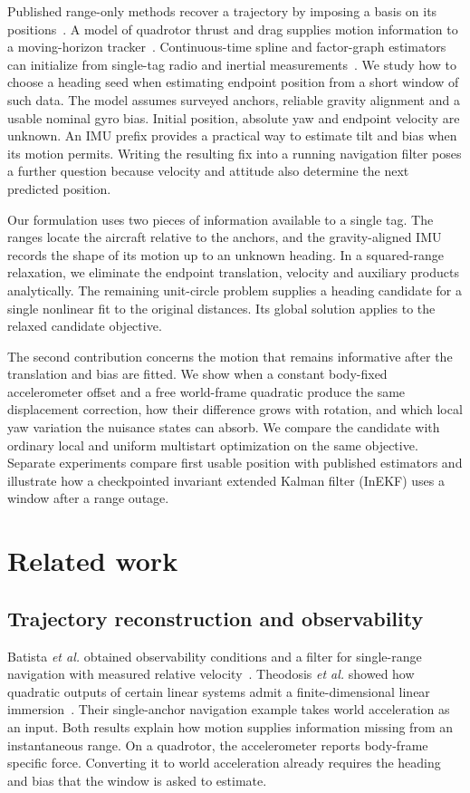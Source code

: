 \documentclass{IEEEtaes}
\begin{document}
Published range-only methods recover a trajectory by imposing a basis on its positions~\cite{pacholska}. A model of quadrotor thrust and drag supplies motion information to a moving-horizon tracker~\cite{pfeiffer}. Continuous-time spline and factor-graph estimators can initialize from single-tag radio and inertial measurements~\cite{sfuise,jiang}. We study how to choose a heading seed when estimating endpoint position from a short window of such data. The model assumes surveyed anchors, reliable gravity alignment and a usable nominal gyro bias. Initial position, absolute yaw and endpoint velocity are unknown. An IMU prefix provides a practical way to estimate tilt and bias when its motion permits. Writing the resulting fix into a running navigation filter poses a further question because velocity and attitude also determine the next predicted position.

Our formulation uses two pieces of information available to a single tag. The ranges locate the aircraft relative to the anchors, and the gravity-aligned IMU records the shape of its motion up to an unknown heading. In a squared-range relaxation, we eliminate the endpoint translation, velocity and auxiliary products analytically. The remaining unit-circle problem supplies a heading candidate for a single nonlinear fit to the original distances. Its global solution applies to the relaxed candidate objective.

The second contribution concerns the motion that remains informative after the translation and bias are fitted. We show when a constant body-fixed accelerometer offset and a free world-frame quadratic produce the same displacement correction, how their difference grows with rotation, and which local yaw variation the nuisance states can absorb. We compare the candidate with ordinary local and uniform multistart optimization on the same objective. Separate experiments compare first usable position with published estimators and illustrate how a checkpointed invariant extended Kalman filter (InEKF) uses a window after a range outage.

\section{Related work}\label{sec:related}
\subsection{Trajectory reconstruction and observability}
Batista \emph{et al.} obtained observability conditions and a filter for single-range navigation with measured relative velocity~\cite{batista}. Theodosis \emph{et al.} showed how quadratic outputs of certain linear systems admit a finite-dimensional linear immersion~\cite{theodosis}. Their single-anchor navigation example takes world acceleration as an input. Both results explain how motion supplies information missing from an instantaneous range. On a quadrotor, the accelerometer reports body-frame specific force. Converting it to world acceleration already requires the heading and bias that the window is asked to estimate.
\end{document}
